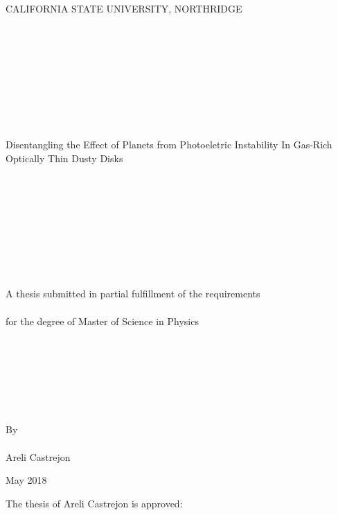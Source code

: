 \documentclass[onecolumn]{report}
\begin{document}
\thispagestyle{empty}

\begin{center}
\large

CALIFORNIA STATE UNIVERSITY, NORTHRIDGE \\~\\~\\~\\~\\~\\ ~\\~\\~\\~\\

Disentangling the Effect of Planets from Photoeletric Instability In Gas-Rich Optically Thin Dusty Disks \\~\\~\\~\\~\\~\\~\\~\\~\\~\\

A thesis submitted in partial fulfillment of the requirements \\~\\

for the degree of Master of Science in Physics \\~\\~\\~\\~\\~\\~\\~\\

By \\~\\ Areli Castrejon


\vfill

May 2018

\end{center}

\normalfont
\newpage
{}

The thesis of Areli Castrejon is approved: \\~\\~\\~\\~\\~\\~\\~\\
\end{document}
